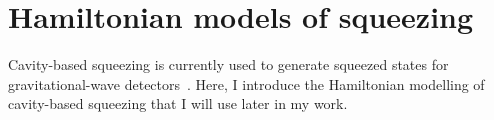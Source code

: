 

\section{Hamiltonian models of squeezing}
\label{sec:Hamiltonian_modelling}


Cavity-based squeezing is currently used to generate squeezed states for gravitational-wave detectors~\cite{aasietal2013}. Here, I introduce the Hamiltonian modelling of cavity-based squeezing that I will use later in my work.

